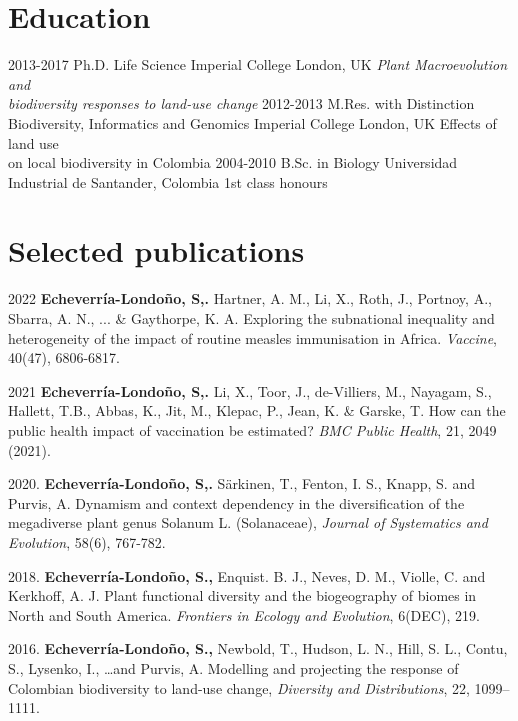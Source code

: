 \documentclass[icon]{twentysecondcv}
\begin{document}
\section{Education}

\begin{twenty}
  \twentyitem
    {2013-2017}
    {Ph.D. {\normalfont Life Science}}
    {Imperial College London, UK}
    {\emph{Plant Macroevolution and \\  biodiversity responses to land-use change}}
  \twentyitem
    {2012-2013}
    {M.Res. with Distinction \\  {\normalfont Biodiversity, Informatics and Genomics}}
    {Imperial College London, UK}
    {Effects of land use  \\  on local biodiversity in Colombia}
  \twentyitem
    {2004-2010}
    {B.Sc. in Biology}
    {Universidad Industrial de Santander, Colombia}
    {1st class honours}
 \end{twenty}
 
 
 \section{Selected publications}

2022 \textbf{Echeverr\'ia-Londo\~no, S,.}  Hartner, A. M., Li, X., Roth, J., Portnoy, A., Sbarra, A. N., ... \& Gaythorpe, K. A. Exploring the subnational inequality and heterogeneity of the impact of routine measles immunisation in Africa. \textit{Vaccine}, 40(47), 6806-6817. 

2021 \textbf{Echeverr\'ia-Londo\~no, S,.}  Li, X., Toor, J., de-Villiers, M., Nayagam, S., Hallett, T.B., Abbas, K., Jit, M., Klepac, P., Jean, K. \&  Garske, T. How can the public health impact of vaccination be estimated? \textit{BMC Public Health}, 21, 2049 (2021).

2020. \textbf{Echeverr\'ia-Londo\~no, S,.}  S{\"a}rkinen, T., Fenton, I. S., Knapp, S. and Purvis, A. Dynamism and context dependency in the diversification of the megadiverse plant genus Solanum L. (Solanaceae), \textit{Journal of Systematics and Evolution},  58(6), 767-782. 

2018. \textbf{Echeverr\'ia-Londo\~no, S.,} Enquist. B. J., Neves, D. M., Violle, C. and Kerkhoff, A. J. Plant functional diversity and the biogeography of biomes in North and South America. \textit{Frontiers in Ecology and Evolution}, 6(DEC), 219.

2016. \textbf{Echeverr\'ia-Londo\~no, S.,} Newbold, T., Hudson, L. N., Hill, S. L., Contu, S., Lysenko, I., \dots and Purvis, A. Modelling and projecting the response of Colombian biodiversity to land-use change, \textit{Diversity and Distributions}, 22, 1099--1111. 


\end{document}
